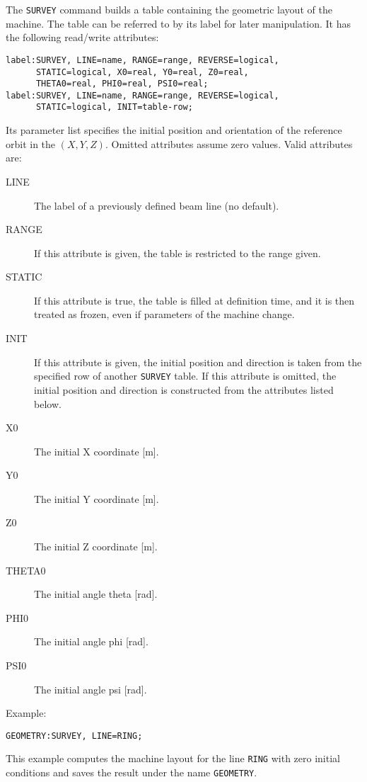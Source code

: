 The \texttt{SURVEY} command builds a table containing the geometric layout
of the machine.
The table can be referred to by its label for later manipulation.
It has the following read/write attributes:
\begin{verbatim}
label:SURVEY, LINE=name, RANGE=range, REVERSE=logical,
      STATIC=logical, X0=real, Y0=real, Z0=real, 
      THETA0=real, PHI0=real, PSI0=real;
label:SURVEY, LINE=name, RANGE=range, REVERSE=logical,
      STATIC=logical, INIT=table-row;
\end{verbatim}
Its parameter list specifies the initial position and orientation
of the reference orbit in the  
$(X,Y,Z)$.
Omitted attributes assume zero values.
Valid attributes are:
\begin{description}
\item[LINE]
  The label of a previously defined beam line (no default).
\item[RANGE]
  If this attribute is given, the table is restricted to the range given.
\item[STATIC]
  If this attribute is true, the table is filled at definition time,
  and it is then treated as frozen, even if parameters of the machine change.
\item[INIT]
  If this attribute is given, the initial position and direction is taken
  from the specified row of another \texttt{SURVEY} table.
  If this attribute is omitted, the initial position and direction is
  constructed from the attributes listed below.
\item[X0]
  The initial X coordinate [m].
\item[Y0]
  The initial Y coordinate [m].
\item[Z0]
  The initial Z coordinate [m].
\item[THETA0]
  The initial angle theta [rad].
\item[PHI0]
  The initial angle phi [rad].
\item[PSI0]
  The initial angle psi [rad].
\end{description}

Example:
\begin{verbatim}
GEOMETRY:SURVEY, LINE=RING;
\end{verbatim}
This example computes the machine layout for the line \texttt{RING} with
zero initial conditions and saves the result under the name
\texttt{GEOMETRY}. 

